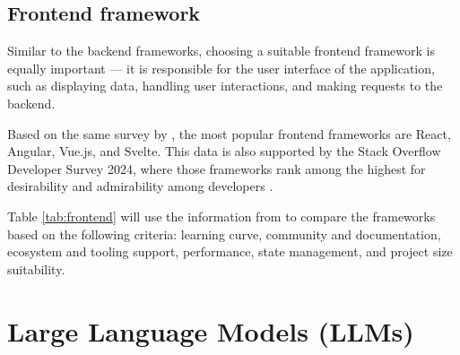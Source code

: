 \subsection{Frontend framework}\label{sec:frontend}

Similar to the backend frameworks, choosing a suitable frontend framework is equally important --- it is responsible for the user interface of the application, such as displaying data, handling user interactions, and making requests to the backend. 

Based on the same survey by \textcite{statista-webframeworks}, the most popular frontend frameworks are React, Angular, Vue.js, and Svelte. This data is also supported by the Stack Overflow Developer Survey 2024, where those frameworks rank among the highest for desirability and admirability among developers \parencite{stackoverflow}.

Table \ref{tab:frontend} will use the information from \textcite{react,angular,vue,svelte} to compare the frameworks based on the following criteria: learning curve, community and documentation, ecosystem and tooling support, performance, state management, and project size suitability.

\begin{table}[h]
    \centering
    \caption{Comparison of frontend frameworks}\label{tab:frontend}
\end{table}

\section{Large Language Models (LLMs)}

